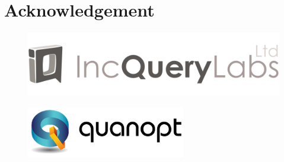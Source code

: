 \chapter*{Acknowledgement}
\label{chap:acknowledge}



\begin{figure}
	\centering
	\includegraphics[width=0.5\linewidth]{include/figures/incquerylabs}
\end{figure}
\begin{figure}
	\centering
	\includegraphics[width=0.5\linewidth]{include/figures/quanopt}
\end{figure}
\vspace{\fill}